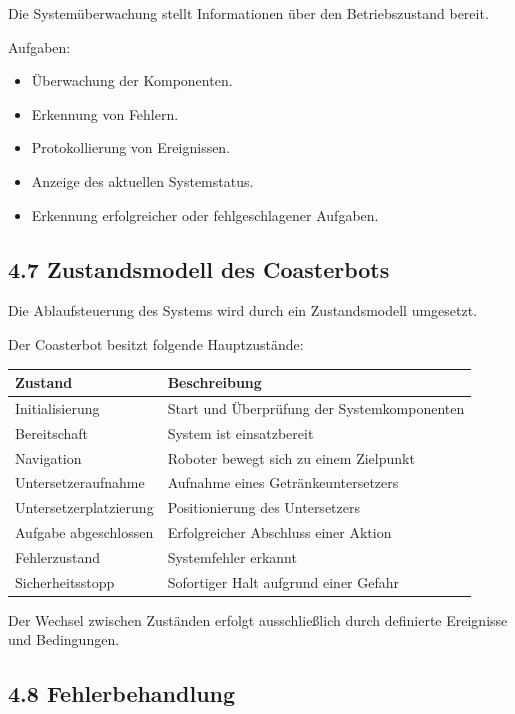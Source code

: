 \documentclass[
]{article}
\providecommand{\tightlist}{%
  \setlength{\itemsep}{0pt}\setlength{\parskip}{0pt}}
\begin{document}
Die Systemüberwachung stellt Informationen über den Betriebszustand
bereit.

Aufgaben:

\begin{itemize}
\tightlist
\item
  Überwachung der Komponenten.
\item
  Erkennung von Fehlern.
\item
  Protokollierung von Ereignissen.
\item
  Anzeige des aktuellen Systemstatus.
\item
  Erkennung erfolgreicher oder fehlgeschlagener Aufgaben.
\end{itemize}

\subsection{4.7 Zustandsmodell des
Coasterbots}\label{zustandsmodell-des-coasterbots}

Die Ablaufsteuerung des Systems wird durch ein Zustandsmodell umgesetzt.

Der Coasterbot besitzt folgende Hauptzustände:

\begin{longtable}[]{@{}ll@{}}
\toprule\noalign{}
Zustand & Beschreibung \\
\midrule\noalign{}
\endhead
\bottomrule\noalign{}
\endlastfoot
Initialisierung & Start und Überprüfung der Systemkomponenten \\
Bereitschaft & System ist einsatzbereit \\
Navigation & Roboter bewegt sich zu einem Zielpunkt \\
Untersetzeraufnahme & Aufnahme eines Getränkeuntersetzers \\
Untersetzerplatzierung & Positionierung des Untersetzers \\
Aufgabe abgeschlossen & Erfolgreicher Abschluss einer Aktion \\
Fehlerzustand & Systemfehler erkannt \\
Sicherheitsstopp & Sofortiger Halt aufgrund einer Gefahr \\
\end{longtable}

Der Wechsel zwischen Zuständen erfolgt ausschließlich durch definierte
Ereignisse und Bedingungen.

\subsection{4.8 Fehlerbehandlung}\label{fehlerbehandlung}
\end{document}
